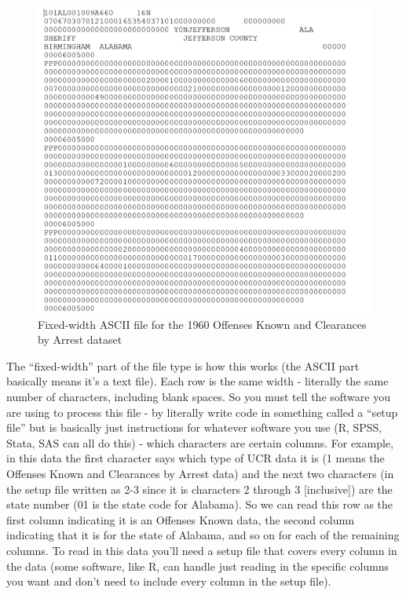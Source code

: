 \documentclass[
  12pt,
  openany]{book}
\begin{document}
\begin{figure}
\includegraphics[width=8.75in]{images/offenses_known_raw_ascii_1960} \caption{Fixed-width ASCII file for the 1960 Offenses Known and Clearances by Arrest dataset}\label{fig:unnamed-chunk-3}
\end{figure}

The ``fixed-width'' part of the file type is how this works (the ASCII part basically means it's a text file). Each row is the same width - literally the same number of characters, including blank spaces. So you must tell the software you are using to process this file - by literally write code in something called a ``setup file'' but is basically just instructions for whatever software you use (R, SPSS, Stata, SAS can all do this) - which characters are certain columns. For example, in this data the first character says which type of UCR data it is (1 means the Offenses Known and Clearances by Arrest data) and the next two characters (in the setup file written as 2-3 since it is characters 2 through 3 {[}inclusive{]}) are the state number (01 is the state code for Alabama). So we can read this row as the first column indicating it is an Offenses Known data, the second column indicating that it is for the state of Alabama, and so on for each of the remaining columns. To read in this data you'll need a setup file that covers every column in the data (some software, like R, can handle just reading in the specific columns you want and don't need to include every column in the setup file).
\end{document}
